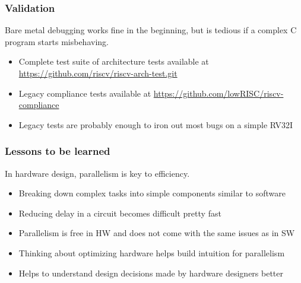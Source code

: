 \documentclass[aspectratio=169]{beamer}
\begin{document}
\begin{frame}

  \frametitle{Validation}

  Bare metal debugging works fine in the beginning, but is tedious if a complex C program starts misbehaving.
  \vspace{1em}
  \begin{itemize}
    \item Complete test suite of architecture tests available at \href{https://github.com/riscv/riscv-arch-test}{ https://github.com/riscv/riscv-arch-test.git}
    \item Legacy compliance tests available at \href{https://github.com/lowRISC/riscv-compliance}{https://github.com/lowRISC/riscv-compliance}
    \item Legacy tests are probably enough to iron out most bugs on a simple RV32I
  \end{itemize}
\end{frame}

\begin{frame}
  \frametitle{Lessons to be learned}

  In hardware design, parallelism is key to efficiency.
  \vspace{2em}
  \begin{itemize}
    \item Breaking down complex tasks into simple components similar to software
    \item Reducing delay in a circuit becomes difficult pretty fast
    \item Parallelism is free in HW and does not come with the same issues as in SW
    \item Thinking about optimizing hardware helps build intuition for parallelism
    \item Helps to understand design decisions made by hardware designers better
  \end{itemize}
\end{frame}
\end{document}
